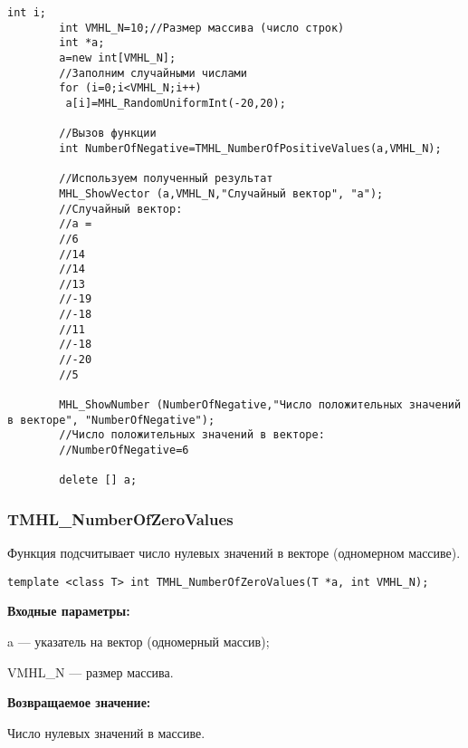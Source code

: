 \documentclass[a4paper,12pt]{article}
\begin{document}
\begin{lstlisting}[label=code_use_TMHL_NumberOfPositiveValues,caption=Пример использования]
        int i;
        int VMHL_N=10;//Размер массива (число строк)
        int *a;
        a=new int[VMHL_N];
        //Заполним случайными числами
        for (i=0;i<VMHL_N;i++)
         a[i]=MHL_RandomUniformInt(-20,20);

        //Вызов функции
        int NumberOfNegative=TMHL_NumberOfPositiveValues(a,VMHL_N);

        //Используем полученный результат
        MHL_ShowVector (a,VMHL_N,"Случайный вектор", "a");
        //Случайный вектор:
        //a =
        //6
        //14
        //14
        //13
        //-19
        //-18
        //11
        //-18
        //-20
        //5

        MHL_ShowNumber (NumberOfNegative,"Число положительных значений в векторе", "NumberOfNegative");
        //Число положительных значений в векторе:
        //NumberOfNegative=6

        delete [] a;
\end{lstlisting}

\subsubsection{TMHL\_NumberOfZeroValues}\label{TMHL_NumberOfZeroValues}

Функция подсчитывает число нулевых значений в векторе (одномерном массиве).


\begin{lstlisting}[label=code_syntax_TMHL_NumberOfZeroValues,caption=Синтаксис]
template <class T> int TMHL_NumberOfZeroValues(T *a, int VMHL_N);
\end{lstlisting}

\textbf{Входные параметры:}

 a --- указатель на вектор (одномерный массив);
 
 VMHL\_N --- размер массива.

\textbf{Возвращаемое значение:}

Число нулевых значений в массиве.
\end{document}
